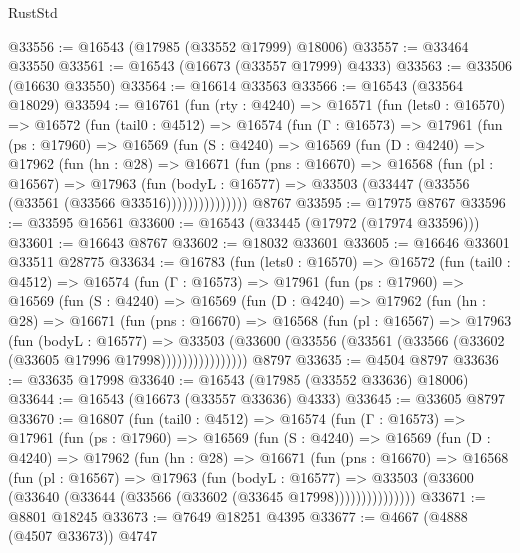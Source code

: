 \begin{lexlean}{RustStd}
\begin{coremodule}
@33556 := @16543 (@17985 (@33552 @17999) @18006)
@33557 := @33464 @33550
@33561 := @16543 (@16673 (@33557 @17999) @4333)
@33563 := @33506 (@16630 @33550)
@33564 := @16614 @33563
@33566 := @16543 (@33564 @18029)
@33594 := @16761
    (fun (rty : @4240) =>
    @16571
      (fun (lets0 : @16570) =>
      @16572
        (fun (tail0 : @4512) =>
        @16574
          (fun (Γ : @16573) =>
          @17961
            (fun (ps : @17960) =>
            @16569
              (fun (S : @4240) =>
              @16569
                (fun (D : @4240) =>
                @17962
                  (fun (hn : @28) =>
                  @16671
                    (fun (pns : @16670) =>
                    @16568
                      (fun (pl : @16567) =>
                      @17963
                        (fun (bodyL : @16577) =>
                        @33503 (@33447 (@33556 (@33561 (@33566 @33516)))))))))))))))
    @8767
@33595 := @17975 @8767
@33596 := @33595 @16561
@33600 := @16543 (@33445 (@17972 (@17974 @33596)))
@33601 := @16643 @8767
@33602 := @18032 @33601
@33605 := @16646 @33601 @33511 @28775
@33634 := @16783
    (fun (lets0 : @16570) =>
    @16572
      (fun (tail0 : @4512) =>
      @16574
        (fun (Γ : @16573) =>
        @17961
          (fun (ps : @17960) =>
          @16569
            (fun (S : @4240) =>
            @16569
              (fun (D : @4240) =>
              @17962
                (fun (hn : @28) =>
                @16671
                  (fun (pns : @16670) =>
                  @16568
                    (fun (pl : @16567) =>
                    @17963
                      (fun (bodyL : @16577) =>
                      @33503
                        (@33600
                          (@33556 (@33561 (@33566 (@33602 (@33605 @17996 @17998))))))))))))))))
    @8797
@33635 := @4504 @8797
@33636 := @33635 @17998
@33640 := @16543 (@17985 (@33552 @33636) @18006)
@33644 := @16543 (@16673 (@33557 @33636) @4333)
@33645 := @33605 @8797
@33670 := @16807
    (fun (tail0 : @4512) =>
    @16574
      (fun (Γ : @16573) =>
      @17961
        (fun (ps : @17960) =>
        @16569
          (fun (S : @4240) =>
          @16569
            (fun (D : @4240) =>
            @17962
              (fun (hn : @28) =>
              @16671
                (fun (pns : @16670) =>
                @16568
                  (fun (pl : @16567) =>
                  @17963
                    (fun (bodyL : @16577) =>
                    @33503 (@33600 (@33640 (@33644 (@33566 (@33602 (@33645 @17998)))))))))))))))
@33671 := @8801 @18245
@33673 := @7649 @18251 @4395
@33677 := @4667 (@4888 (@4507 @33673)) @4747

\end{coremodule}
\end{lexlean}
